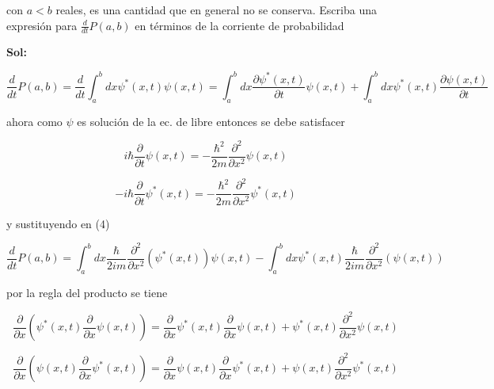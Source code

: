 \documentclass[12pt,a4paper]{article}
\begin{document}
\begin{enumerate}
    con $a<b$ reales, es una cantidad que en general no se conserva. Escriba una expresión para $\frac{d}{d t} P(a,b)$ en términos de la corriente de probabilidad
    
    \textbf{Sol:}
    
    \begin{equation}
        \frac{d}{d t} P(a,b) = \frac{d}{d t} \int_{a}^{b} dx \psi^{*} (x,t) \psi(x,t) =\int_{a}^{b} dx \frac{\partial \psi^{*} (x,t)}{\partial t} \psi(x,t) + \int_{a}^{b} dx \psi^{*} (x,t) \frac{\partial \psi(x,t)}{\partial t}
    \end{equation}
    
    ahora como $\psi$ es solución de la ec. de  libre entonces se debe satisfacer
    
    \begin{equation*}
        i \hbar \frac{\partial}{\partial t} \psi (x,t) = - \frac{\hbar^2}{2m} \frac{\partial^2}{\partial x^2} \psi(x,t)
    \end{equation*}
    
    \begin{equation*}
        -i \hbar \frac{\partial}{\partial t} \psi^* (x,t) = - \frac{\hbar^2}{2m} \frac{\partial^2}{\partial x^2} \psi^*(x,t)
    \end{equation*}
    
    y sustituyendo en (4)
    
    \begin{equation*}
        \frac{d}{d t} P(a,b) = \int_{a}^{b} dx \frac{\hbar}{2im} \frac{\partial^2}{\partial x^2} (\psi^*(x,t)) \psi(x,t) - \int_{a}^{b} dx \psi^{*} (x,t) \frac{\hbar}{2im} \frac{\partial^2}{\partial x^2} (\psi(x,t))
    \end{equation*}
    
    por la regla del producto se tiene
     
    \begin{equation*}
        \frac{\partial}{\partial x}(\psi^*(x,t) \frac{\partial}{\partial x} \psi(x,t)) =  \frac{\partial}{\partial x} \psi^* (x,t)\frac{\partial}{\partial x} \psi(x,t) + \psi^*(x,t)\frac{\partial^2}{\partial x^2} \psi(x,t)
    \end{equation*}
    
    \begin{equation*}
        \frac{\partial}{\partial x}(\psi(x,t) \frac{\partial}{\partial x} \psi^*(x,t)) =  \frac{\partial}{\partial x} \psi (x,t)\frac{\partial}{\partial x} \psi^*(x,t) + \psi(x,t)\frac{\partial^2}{\partial x^2} \psi^*(x,t)
    \end{equation*}
    

\end{enumerate}
\end{document}
